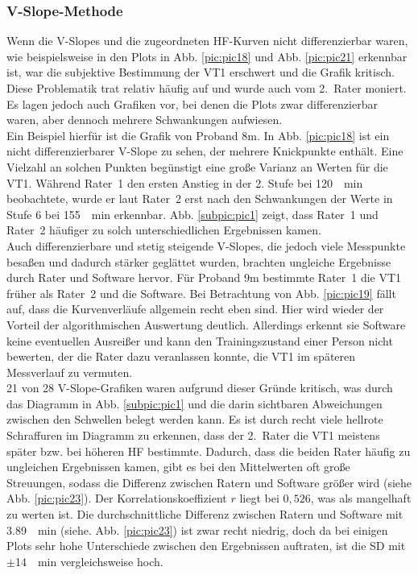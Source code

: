 \subsubsection{V-Slope-Methode}
%
Wenn die V-Slopes und die zugeordneten \gls{HF}-Kurven nicht differenzierbar waren, wie beispielsweise in den Plots in Abb. \ref{pic:pic18} und Abb. \ref{pic:pic21} erkennbar ist, war die subjektive Bestimmung der VT1 erschwert und die Grafik kritisch. Diese Problematik trat relativ häufig auf und wurde auch vom 2.~Rater moniert. Es lagen jedoch auch Grafiken vor, bei denen die Plots zwar differenzierbar waren, aber dennoch mehrere Schwankungen aufwiesen.\\
Ein Beispiel hierfür ist die Grafik von Proband 8m. In Abb. \ref{pic:pic18} ist ein nicht differenzierbarer V-Slope zu sehen, der mehrere Knickpunkte enthält. Eine Vielzahl an solchen Punkten begünstigt eine große Varianz an Werten für die VT1. Während Rater~1 den ersten Anstieg in der 2. Stufe bei \SI{120}{\per\minute} beobachtete, wurde er laut Rater~2 erst nach den Schwankungen der Werte in Stufe 6 bei \SI{155}{\per\minute} erkennbar. Abb. \ref{subpic:pic1} zeigt, dass Rater~1 und Rater~2 häufiger zu solch unterschiedlichen Ergebnissen kamen.\\
Auch differenzierbare und stetig steigende V-Slopes, die jedoch viele Messpunkte besaßen und dadurch stärker geglättet wurden, brachten ungleiche Ergebnisse durch Rater und Software hervor. Für Proband 9m bestimmte Rater~1 die VT1 früher als Rater~2 und die Software. Bei Betrachtung von Abb. \ref{pic:pic19} fällt auf, dass die Kurvenverläufe allgemein recht eben sind. Hier wird wieder der Vorteil der algorithmischen Auswertung deutlich. Allerdings erkennt sie Software keine eventuellen Ausreißer und kann den Trainingszustand einer Person nicht bewerten, der die Rater dazu veranlassen konnte, die VT1 im späteren Messverlauf zu vermuten.\\
21 von 28 V-Slope-Grafiken waren aufgrund dieser Gründe kritisch, was durch das Diagramm in Abb. \ref{subpic:pic1} und die darin sichtbaren Abweichungen zwischen den Schwellen belegt werden kann. Es ist durch recht viele hellrote Schraffuren im Diagramm zu erkennen, dass der 2.~Rater die VT1 meistens später bzw. bei höheren \gls{HF} bestimmte. Dadurch, dass die beiden Rater häufig zu ungleichen Ergebnissen kamen, gibt es bei den Mittelwerten oft große Streuungen, sodass die Differenz zwischen Ratern und Software größer wird (siehe Abb. \ref{pic:pic23}). Der Korrelationskoeffizient $r$ liegt bei $0,526$, was als mangelhaft zu werten ist. Die durchschnittliche Differenz zwischen Ratern und Software mit \SI{3,89}{\per\minute} (siehe. Abb. \ref{pic:pic23}) ist zwar recht niedrig, doch da bei einigen Plots sehr hohe Unterschiede zwischen den Ergebnissen auftraten, ist die \gls{SD} mit $\pm$\SI{14}{\per\minute} vergleichsweise hoch.
%
